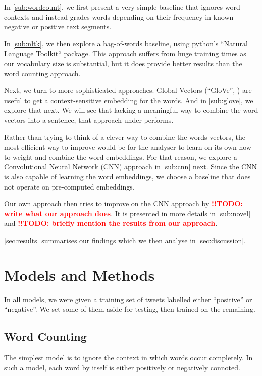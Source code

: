 \documentclass[10pt,conference,compsocconf]{IEEEtran}
\newcommand{\todoThis}[1]{\textcolor{red}{\textbf{!!TODO: #1}}}
\begin{document}
In \autoref{sub:wordcount}, we first present a very simple baseline that ignores word contexts and instead grades words depending on their frequency in known negative or positive text segments.

In \autoref{sub:nltk}, we then explore a bag-of-words baseline, using python's ``Natural Language Toolkit`` package. This approach suffers from huge training times as our vocabulary size is substantial, but it does provide better results than the word counting approach.

Next, we turn to more sophisticated approaches.
Global Vectors (``GloVe'', \cite{glove_paper}) are useful to get a context-sensitive embedding for the words. And in \autoref{sub:glove}, we explore that next.
We will see that lacking a meaningful way to combine the word vectors into a sentence, that approach under-performs.

Rather than trying to think of a clever way to combine the words vectors, the most efficient way to improve would be for the analyser to learn on its own how to weight and combine the word embeddings. For that reason, we explore a Convolutional Neural Network (CNN) approach in \autoref{sub:cnn} next. Since the CNN is also capable of learning the word embeddings, we choose a baseline that does not operate on pre-computed embeddings.

Our own approach then tries to improve on the CNN approach by \todoThis{write what our approach does}. It is presented in more details in \autoref{sub:novel} and \todoThis{briefly mention the results from our approach}.

\autoref{sec:results} summarises our findings which we then analyse in \autoref{sec:discussion}.
  
\section{Models and Methods}\label{sec:models}
In all models, we were given a training set of tweets labelled either ``positive'' or ``negative''.
We set some of them aside for testing, then trained on the remaining.

\subsection{Word Counting}\label{sub:wordcount}
The simplest model is to ignore the context in which words occur completely. In such a model, each word by itself is either positively or negatively connoted.
\end{document}
